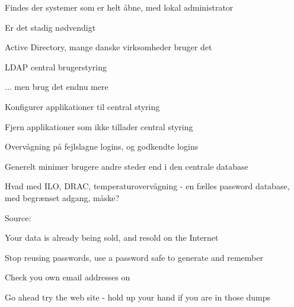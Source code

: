\documentclass[Screen16to9,17pt]{foils}
\begin{document}

\begin{list2}
\item Findes der systemer som er helt åbne, med lokal administrator
\item Er det stadig nødvendigt
\end{list2}



\begin{list1}
\item Active Directory, mange danske virksomheder bruger det
\item LDAP central brugerstyring
\item ... men brug det endnu mere
\begin{list2}
\item Konfigurer applikationer til central styring
\item Fjern applikationer som ikke tillader central styring
\item Overvågning på fejlslagne logins, og godkendte logins
\end{list2}
\item Generelt minimer brugere andre steder end i den centrale database
\end{list1}

\vskip 1cm
Hvad med ILO, DRAC, temperaturovervågning - en fælles password database, med begrænset adgang, måske?




Source:




\begin{list1}
\item Your data is already being sold, and resold on the Internet
\item Stop reusing passwords, use a password safe to generate and remember
\item Check you own email addresses on 
\end{list1}

\centerline{Go ahead try the web site - hold up your hand if you are in those dumps}


\end{document}
